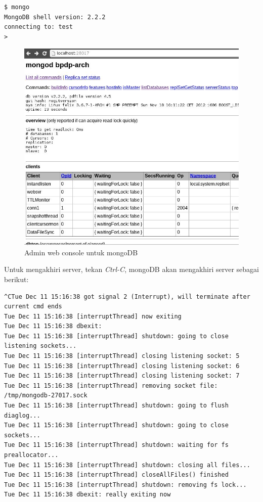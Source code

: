 \lstset{language=bash,caption=Shell mongoDB (mongo)}
\begin{lstlisting}
$ mongo
MongoDB shell version: 2.2.2
connecting to: test
> 
\end{lstlisting}

  \begin{figure}
    \begin{center}
      \includegraphics[scale=0.5]{images/mongodb-web-interface.jpg}
    \end{center}
    \caption{Admin web console untuk mongoDB}
    \label{fig:mongowebadminconsole}
  \end{figure}

Untuk mengakhiri server, tekan \textit{Ctrl-C}, mongoDB akan mengakhiri server sebagai berikut:

\lstset{language=bash,caption=Mengakhiri server MongoDB (mongod)}
\begin{lstlisting}
^CTue Dec 11 15:16:38 got signal 2 (Interrupt), will terminate after current cmd ends
Tue Dec 11 15:16:38 [interruptThread] now exiting
Tue Dec 11 15:16:38 dbexit: 
Tue Dec 11 15:16:38 [interruptThread] shutdown: going to close listening sockets...
Tue Dec 11 15:16:38 [interruptThread] closing listening socket: 5
Tue Dec 11 15:16:38 [interruptThread] closing listening socket: 6
Tue Dec 11 15:16:38 [interruptThread] closing listening socket: 7
Tue Dec 11 15:16:38 [interruptThread] removing socket file: /tmp/mongodb-27017.sock
Tue Dec 11 15:16:38 [interruptThread] shutdown: going to flush diaglog...
Tue Dec 11 15:16:38 [interruptThread] shutdown: going to close sockets...
Tue Dec 11 15:16:38 [interruptThread] shutdown: waiting for fs preallocator...
Tue Dec 11 15:16:38 [interruptThread] shutdown: closing all files...
Tue Dec 11 15:16:38 [interruptThread] closeAllFiles() finished
Tue Dec 11 15:16:38 [interruptThread] shutdown: removing fs lock...
Tue Dec 11 15:16:38 dbexit: really exiting now
\end{lstlisting}

